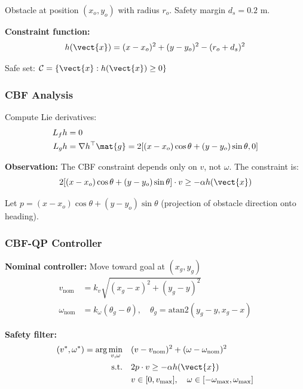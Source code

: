 Obstacle at position $(x_o, y_o)$ with radius $r_o$. Safety margin $d_s = 0.2$ m.

\textbf{Constraint function:}
\begin{equation}
h(\vect{x}) = (x - x_o)^2 + (y - y_o)^2 - (r_o + d_s)^2
\end{equation}

Safe set: $\mathcal{C} = \{\vect{x} : h(\vect{x}) \geq 0\}$

\subsubsection{CBF Analysis}

Compute Lie derivatives:
\begin{align}
L_f h &= 0 \\
L_g h &= \nabla h^\top \mat{g} = 2[(x - x_o)\cos\theta + (y - y_o)\sin\theta, 0]
\end{align}

\textbf{Observation:} The CBF constraint depends only on $v$, not $\omega$. The constraint is:
\begin{equation}
2[(x - x_o)\cos\theta + (y - y_o)\sin\theta] \cdot v \geq -\alpha h(\vect{x})
\end{equation}

Let $p = (x - x_o)\cos\theta + (y - y_o)\sin\theta$ (projection of obstacle direction onto heading).

\subsubsection{CBF-QP Controller}

\textbf{Nominal controller:} Move toward goal at $(x_g, y_g)$
\begin{align}
v_{\text{nom}} &= k_v \sqrt{(x_g - x)^2 + (y_g - y)^2} \\
\omega_{\text{nom}} &= k_\omega (\theta_g - \theta), \quad \theta_g = \text{atan2}(y_g - y, x_g - x)
\end{align}

\textbf{Safety filter:}
\begin{align}
(v^*, \omega^*) = \arg\min_{v, \omega} \quad & (v - v_{\text{nom}})^2 + (\omega - \omega_{\text{nom}})^2 \\
\text{s.t.} \quad & 2p \cdot v \geq -\alpha h(\vect{x}) \\
& v \in [0, v_{\max}], \quad \omega \in [-\omega_{\max}, \omega_{\max}]
\end{align}

